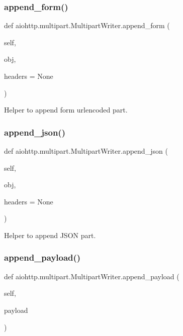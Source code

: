 \subsubsection{\texorpdfstring{append\+\_\+form()}{append\_form()}}
{\footnotesize\ttfamily def aiohttp.\+multipart.\+Multipart\+Writer.\+append\+\_\+form (\begin{DoxyParamCaption}\item[{}]{self,  }\item[{}]{obj,  }\item[{}]{headers = {\ttfamily None} }\end{DoxyParamCaption})}

\begin{DoxyVerb}Helper to append form urlencoded part.\end{DoxyVerb}
 \mbox{\label{classaiohttp_1_1multipart_1_1_multipart_writer_acac3d6614a647dab7d337c3539907718}} 
\subsubsection{\texorpdfstring{append\+\_\+json()}{append\_json()}}
{\footnotesize\ttfamily def aiohttp.\+multipart.\+Multipart\+Writer.\+append\+\_\+json (\begin{DoxyParamCaption}\item[{}]{self,  }\item[{}]{obj,  }\item[{}]{headers = {\ttfamily None} }\end{DoxyParamCaption})}

\begin{DoxyVerb}Helper to append JSON part.\end{DoxyVerb}
 \mbox{\label{classaiohttp_1_1multipart_1_1_multipart_writer_a8a5a821be4573c2f92bab6a0b84e09a3}} 
\subsubsection{\texorpdfstring{append\+\_\+payload()}{append\_payload()}}
{\footnotesize\ttfamily def aiohttp.\+multipart.\+Multipart\+Writer.\+append\+\_\+payload (\begin{DoxyParamCaption}\item[{}]{self,  }\item[{}]{payload }\end{DoxyParamCaption})}

